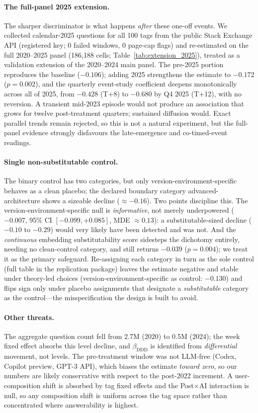 \paragraph{The full-panel 2025 extension.}
The sharper discriminator is what happens \emph{after} these
one-off events. We collected calendar-2025 questions for all
100 tags from the public Stack Exchange API (registered key;
0 failed windows, 0 page-cap flags) and re-estimated on the
full 2020--2025 panel (186{,}188 cells;
Table~\ref{tab:extension_2025}), treated as a validation
extension of the 2020--2024 main panel. The pre-2025 portion
reproduces the baseline ($-0.106$); adding 2025 strengthens the
estimate to $-0.172$ ($p=0.002$), and the quarterly event-study
coefficient deepens monotonically across all of 2025, from
$-0.428$ (T$+$8) to $-0.680$ by Q4 2025 (T$+$12), with no
reversion. A transient mid-2023 episode would not produce an
association that grows for twelve post-treatment quarters;
sustained diffusion would. Exact parallel trends remain
rejected, so this is not a natural experiment, but the
full-panel evidence strongly disfavours the late-emergence and
co-timed-event readings.



\paragraph{Single non-substitutable control.}
The binary control has two categories, but only
version-environment-specific behaves as a clean placebo; the
declared boundary category advanced-architecture shows a
sizeable decline ($\approx-0.16$). Two points discipline this.
The version-environment-specific null is \emph{informative},
not merely underpowered ($-0.007$, 95\% CI $[-0.099,+0.085]$,
MDE $\approx0.13$): a substitutable-sized decline ($-0.10$ to
$-0.29$) would very likely have been detected and was not. And
the \emph{continuous} embedding substitutability score sidesteps
the dichotomy entirely, needing no clean-control category, and
still returns $-0.039$ ($p=0.004$); we treat it as the primary
safeguard. Re-assigning each category in turn as the sole
control (full table in the replication package) leaves the
estimate negative and stable under theory-led choices
(version-environment-specific as control: $-0.130$) and flips
sign only under placebo assignments that designate a
\emph{substitutable} category as the control---the
misspecification the design is built to avoid.

\paragraph{Other threats.}
The aggregate question count fell from 2.7M (2020) to 0.5M
(2024); the week fixed effect absorbs this level decline, and
$\beta_{\text{DDD}}$ is identified from \emph{differential}
movement, not levels. The pre-treatment window was not LLM-free
(Codex, Copilot preview, GPT-3 API), which biases the estimate
\emph{toward zero}, so our numbers are likely conservative with
respect to the post-2022 increment. A user-composition shift is
absorbed by tag fixed effects and the Post$\times$AI interaction
is null, so any composition shift is uniform across the tag
space rather than concentrated where answerability is highest.
